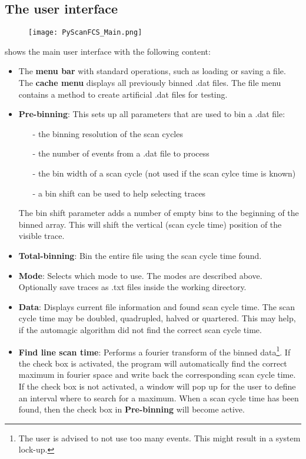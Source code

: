 \subsection{The user interface}
\begin{figure}[h]
\centering
\texttt{[image: PyScanFCS\_Main.png]}
\end{figure}
 shows the main user interface with the following content:
\begin{itemize}
\item The \textbf{menu bar} with standard operations, such as loading or saving a file. The \textbf{cache menu} displays all previously binned \mytilde .dat files. The file menu contains a method to create artificial \mytilde .dat files for testing.

\item \textbf{Pre-binning}: This sets up all parameters that are used to bin a \mytilde .dat file:
	\begin{itemize}
	\item[-] the binning resolution of the scan cycles
	\item[-] the number of events from a \mytilde .dat file to process
	\item[-] the bin width of a scan cycle (not used if the scan cylce time is known)
	\item[-] a bin shift can be used to help selecting traces
	\end{itemize}
The bin shift parameter adds a number of empty bins to the beginning of the binned array. This will shift the vertical (scan cycle time) position of the visible trace.

\item \textbf{Total-binning}: Bin the entire file using the scan cycle time found.

\item \textbf{Mode}: Selects which mode to use. The modes are described above. Optionally save traces as \mytilde .txt files inside the working directory.

\item \textbf{Data}: Displays current file information and found scan cycle time. The scan cycle time may be doubled, quadrupled, halved or quartered. This may help, if the automagic algorithm did not find the correct scan cycle time.

\item  \textbf{Find line scan time}: Performs a fourier transform of the binned data\footnote{The user is advised to not use too many events. This might result in a system lock-up.}. If the check box is activated, the program will automatically find the correct maximum in fourier space and write back the corresponding scan cycle time. If the check box is not activated, a window will pop up for the user to define an interval where to search for a maximum. When a scan cycle time has been found, then the check box in \textbf{Pre-binning} will become active.


\end{itemize}
